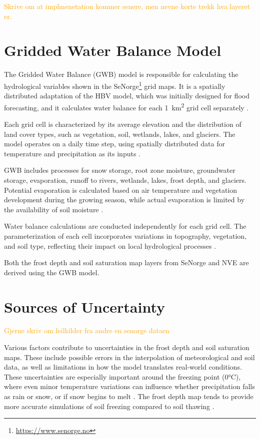 \textcolor{orange}{Skrive om at implmenetation kommer senere, men nevne korte trekk hva layeret er.}

\section{Gridded Water Balance Model}

The Gridded Water Balance (GWB) model is responsible for calculating the hydrological variables shown in the SeNorge\footnote{\url{https://www.senorge.no}} grid maps. It is a spatially distributed adaptation of the HBV model, which was initially designed for flood forecasting, and it calculates water balance for each \qty{1}{\kilo\meter\squared} grid cell separately \cite{nve2025waterdata}.

Each grid cell is characterized by its average elevation and the distribution of land cover types, such as vegetation, soil, wetlands, lakes, and glaciers. The model operates on a daily time step, using spatially distributed data for temperature and precipitation as its inputs \cite{nve2025waterdata}.

GWB includes processes for snow storage, root zone moisture, groundwater storage, evaporation, runoff to rivers, wetlands, lakes, frost depth, and glaciers. Potential evaporation is calculated based on air temperature and vegetation development during the growing season, while actual evaporation is limited by the availability of soil moisture \cite{nve2025waterdata}.

Water balance calculations are conducted independently for each grid cell. The parameterization of each cell incorporates variations in topography, vegetation, and soil type, reflecting their impact on local hydrological processes \cite{nve2025waterdata}.

Both the frost depth and soil saturation map layers from SeNorge and NVE are derived using the GWB model.

\section{Sources of Uncertainty}

\textcolor{orange}{Gjerne skriv om feilkilder fra andre en senorge dataen}

Various factors contribute to uncertainties in the frost depth and soil saturation maps. These include possible errors in the interpolation of meteorological and soil data, as well as limitations in how the model translates real-world conditions. These uncertainties are especially important around the freezing point (0°C), where even minor temperature variations can influence whether precipitation falls as rain or snow, or if snow begins to melt \cite{senorge_watermap}. The frost depth map tends to provide more accurate simulations of soil freezing compared to soil thawing \cite{nve2025waterdata}.

